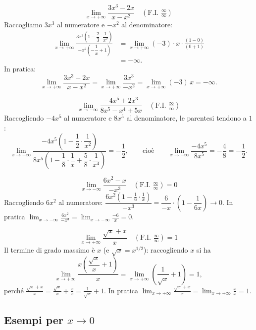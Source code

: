 \documentclass[11pt,a4paper]{article}
\begin{document}
\begin{esempio}
\[
\lim_{x\to+\infty}\frac{3x^3 - 2x}{x - x^2} \quad (\text{F.I. } \tfrac{\infty}{\infty})
\]
Raccogliamo $3x^3$ al numeratore e $-x^2$ al denominatore:
\[
\begin{aligned}\lim_{x\to+\infty}\frac{3x^3\left(1 - \dfrac{2}{3}\cdot\dfrac{1}{x^2}\right)}{-x^2\left(-\dfrac{1}{x} + 1\right)}
&= \lim_{x\to+\infty}(-3)\cdot x\cdot\frac{(1 - 0)}{(0 + 1)} \\ &= -\infty .\end{aligned}
\]
In pratica:
\[
\lim_{x\to+\infty}\frac{3x^3 - 2x}{x - x^2} = \lim_{x\to+\infty}\frac{3x^3}{-x^2} = \lim_{x\to+\infty}(-3)\,x = -\infty .
\]
\end{esempio}

\begin{esempio}
\[
\lim_{x\to-\infty}\frac{-4x^5 + 2x^3}{8x^5 - x^4 + 5x} \quad (\text{F.I. } \tfrac{\infty}{\infty})
\]
Raccogliendo $-4x^5$ al numeratore e $8x^5$ al denominatore, le parentesi tendono a $1$:
\[
\lim_{x\to-\infty}\frac{-4x^5\left(1 - \dfrac{1}{2}\cdot\dfrac{1}{x^2}\right)}{8x^5\left(1 - \dfrac{1}{8}\cdot\dfrac{1}{x} + \dfrac{5}{8}\cdot\dfrac{1}{x^4}\right)} = -\frac{1}{2},
\qquad\text{cioè}\qquad
\lim_{x\to-\infty}\frac{-4x^5}{8x^5} = -\frac{4}{8} = -\frac{1}{2}.
\]
\end{esempio}

\begin{esempio}
\[
\lim_{x\to-\infty}\frac{6x^2 - x}{-x^3} \quad (\text{F.I. } \tfrac{\infty}{\infty}) = 0
\]
Raccogliendo $6x^2$ al numeratore: $\dfrac{6x^2\left(1 - \frac{1}{6}\cdot\frac{1}{x}\right)}{-x^3} = \dfrac{6}{-x}\cdot\left(1 - \dfrac{1}{6x}\right)\to 0$. In pratica $\displaystyle\lim_{x\to-\infty}\frac{6x^2}{-x^3} = \lim_{x\to-\infty}\frac{-6}{x} = 0$.
\end{esempio}

\begin{esempio}
\[
\lim_{x\to+\infty}\frac{\sqrt{x} + x}{x} \quad (\text{F.I. } \tfrac{\infty}{\infty}) = 1
\]
Il termine di grado massimo è $x$ (e $\sqrt x = x^{1/2}$): raccogliendo $x$ si ha
\[
\lim_{x\to+\infty}\frac{x\left(\dfrac{\sqrt{x}}{x} + 1\right)}{x} = \lim_{x\to+\infty}\left(\frac{1}{\sqrt{x}} + 1\right) = 1,
\]
perché $\frac{\sqrt{x} + x}{x} = \frac{\sqrt x}{x} + \frac{x}{x} = \frac{1}{\sqrt x} + 1$. In pratica $\displaystyle\lim_{x\to+\infty}\frac{\sqrt{x} + x}{x} = \lim_{x\to+\infty}\frac{x}{x} = 1$.
\end{esempio}

\subsection{Esempi per $x \to 0$}
\end{document}
